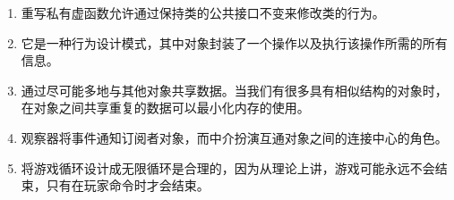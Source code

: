 \begin{enumerate}
	\item 重写私有虚函数允许通过保持类的公共接口不变来修改类的行为。
	\item 它是一种行为设计模式，其中对象封装了一个操作以及执行该操作所需的所有信息。
	\item 通过尽可能多地与其他对象共享数据。当我们有很多具有相似结构的对象时，在对象之间共享重复的数据可以最小化内存的使用。
	\item 观察器将事件通知订阅者对象，而中介扮演互通对象之间的连接中心的角色。
	\item 将游戏循环设计成无限循环是合理的，因为从理论上讲，游戏可能永远不会结束，只有在玩家命令时才会结束。
\end{enumerate}












